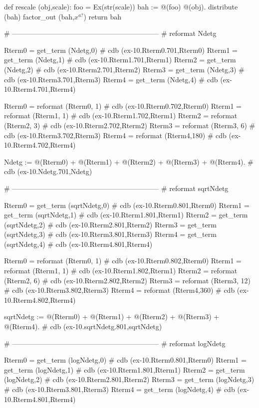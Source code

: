 \documentclass[12pt]{cdblatex}
\begin{document}
\begin{cadabra}
   def rescale (obj,scale):
       foo  = Ex(str(scale))
       bah := @(foo) @(obj).
       distribute  (bah)
       factor_out  (bah,$x^{a?}$)
       return bah

   # ---------------------------------------------------------------
   # reformat Ndetg

   Rterm0 = get_term (Ndetg,0)       # cdb (ex-10.Rterm0.701,Rterm0)
   Rterm1 = get_term (Ndetg,1)       # cdb (ex-10.Rterm1.701,Rterm1)
   Rterm2 = get_term (Ndetg,2)       # cdb (ex-10.Rterm2.701,Rterm2)
   Rterm3 = get_term (Ndetg,3)       # cdb (ex-10.Rterm3.701,Rterm3)
   Rterm4 = get_term (Ndetg,4)       # cdb (ex-10.Rterm4.701,Rterm4)

   Rterm0 = reformat (Rterm0,  1)    # cdb (ex-10.Rterm0.702,Rterm0)
   Rterm1 = reformat (Rterm1,  1)    # cdb (ex-10.Rterm1.702,Rterm1)
   Rterm2 = reformat (Rterm2,  3)    # cdb (ex-10.Rterm2.702,Rterm2)
   Rterm3 = reformat (Rterm3,  6)    # cdb (ex-10.Rterm3.702,Rterm3)
   Rterm4 = reformat (Rterm4,180)    # cdb (ex-10.Rterm4.702,Rterm4)

   Ndetg := @(Rterm0) + @(Rterm1) + @(Rterm2) + @(Rterm3) + @(Rterm4).  # cdb (ex-10.Ndetg.701,Ndetg)

   # ---------------------------------------------------------------
   # reformat sqrtNdetg

   Rterm0 = get_term (sqrtNdetg,0)   # cdb (ex-10.Rterm0.801,Rterm0)
   Rterm1 = get_term (sqrtNdetg,1)   # cdb (ex-10.Rterm1.801,Rterm1)
   Rterm2 = get_term (sqrtNdetg,2)   # cdb (ex-10.Rterm2.801,Rterm2)
   Rterm3 = get_term (sqrtNdetg,3)   # cdb (ex-10.Rterm3.801,Rterm3)
   Rterm4 = get_term (sqrtNdetg,4)   # cdb (ex-10.Rterm4.801,Rterm4)

   Rterm0 = reformat (Rterm0,  1)    # cdb (ex-10.Rterm0.802,Rterm0)
   Rterm1 = reformat (Rterm1,  1)    # cdb (ex-10.Rterm1.802,Rterm1)
   Rterm2 = reformat (Rterm2,  6)    # cdb (ex-10.Rterm2.802,Rterm2)
   Rterm3 = reformat (Rterm3, 12)    # cdb (ex-10.Rterm3.802,Rterm3)
   Rterm4 = reformat (Rterm4,360)    # cdb (ex-10.Rterm4.802,Rterm4)

   sqrtNdetg := @(Rterm0) + @(Rterm1) + @(Rterm2) + @(Rterm3) + @(Rterm4).  # cdb (ex-10.sqrtNdetg.801,sqrtNdetg)

   # ---------------------------------------------------------------
   # reformat logNdetg

   Rterm0 = get_term (logNdetg,0)    # cdb (ex-10.Rterm0.801,Rterm0)
   Rterm1 = get_term (logNdetg,1)    # cdb (ex-10.Rterm1.801,Rterm1)
   Rterm2 = get_term (logNdetg,2)    # cdb (ex-10.Rterm2.801,Rterm2)
   Rterm3 = get_term (logNdetg,3)    # cdb (ex-10.Rterm3.801,Rterm3)
   Rterm4 = get_term (logNdetg,4)    # cdb (ex-10.Rterm4.801,Rterm4)


\end{cadabra}
\end{document}
